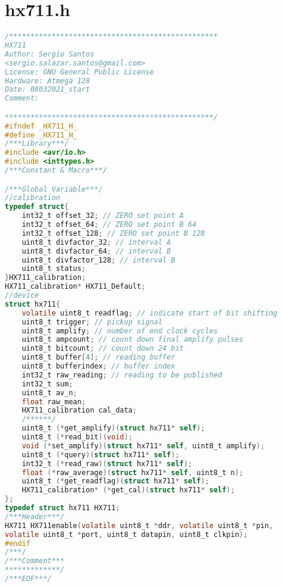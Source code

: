\chapter{hx711.h}
\begin{lstlisting}[language=C, caption={hx711.h}, label=hx711-h, captionpos=b]
/*************************************************
HX711
Author: Sergio Santos
<sergio.salazar.santos@gmail.com>
License: GNU General Public License
Hardware: Atmega 128
Date: 08032021_start
Comment:

*************************************************/
#ifndef _HX711_H_
#define _HX711_H_
/***Library***/
#include <avr/io.h>
#include <inttypes.h>
/***Constant & Macro***/

/***Global Variable***/
//calibration
typedef struct{
	int32_t offset_32; // ZERO set point A
	int32_t offset_64; // ZERO set point B 64
	int32_t offset_128; // ZERO set point B 128
	uint8_t divfactor_32; // interval A
	uint8_t divfactor_64; // interval B
	uint8_t divfactor_128; // interval B
	uint8_t status;
}HX711_calibration;
HX711_calibration* HX711_Default;
//device
struct hx711{
	volatile uint8_t readflag; // indicate start of bit shifting
	uint8_t trigger; // pickup signal
	uint8_t amplify; // number of end clock cycles
	uint8_t ampcount; // count down final amplify pulses
	uint8_t bitcount; // count down 24 bit
	uint8_t buffer[4]; // reading buffer
	uint8_t bufferindex; // buffer index
	int32_t raw_reading; // reading to be published
	int32_t sum;
	uint8_t av_n;
	float raw_mean;
	HX711_calibration cal_data;
	/******/
	uint8_t (*get_amplify)(struct hx711* self);
	uint8_t (*read_bit)(void);
	void (*set_amplify)(struct hx711* self, uint8_t amplify);
	uint8_t (*query)(struct hx711* self);
	int32_t (*read_raw)(struct hx711* self);
	float (*raw_average)(struct hx711* self, uint8_t n);
	uint8_t (*get_readflag)(struct hx711* self);
	HX711_calibration* (*get_cal)(struct hx711* self);
};
typedef struct hx711 HX711;
/***Header***/
HX711 HX711enable(volatile uint8_t *ddr, volatile uint8_t *pin,
volatile uint8_t *port, uint8_t datapin, uint8_t clkpin);
#endif
/***/
/***Comment***
*************/
/***EOF***/
\end{lstlisting}
